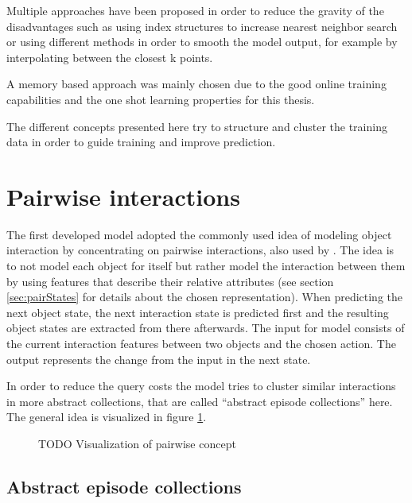 Multiple approaches have been proposed in order to reduce the gravity of the 
disadvantages such as using index structures to increase nearest neighbor 
search or using different methods in order to smooth the model output, for 
example by interpolating between the closest k points. 

A memory based approach was mainly chosen due to the good online training 
capabilities and the one shot learning properties for this thesis.

The different concepts presented here try to structure and cluster the training 
data in order to guide training and improve prediction.

\section{Pairwise interactions\label{sec:pairInteractions}}

The first developed model adopted the commonly used idea of modeling object 
interaction by concentrating on pairwise interactions, also used by 
\cite{pairwise interaction}. The idea is to not model each object for itself 
but rather model the interaction between them by using features that describe 
their relative attributes (see section \ref{sec:pairStates} for details about 
the chosen representation). 
When predicting the next object state, the next interaction state is predicted 
first and the resulting object states are extracted from there afterwards. The 
input for model consists of the current interaction features between two 
objects and the chosen action. The output represents the change from the input 
in the next state.

In order to reduce the query costs the model tries to cluster similar 
interactions in more abstract collections, that are called \enquote{abstract 
episode collections} here. The general idea is visualized in figure \ref{fig:pairIdea}.

\begin{figure}
\caption{TODO Visualization of pairwise concept}
\label{fig:pairIdea}
\end{figure}


\subsection{Abstract episode collections}

